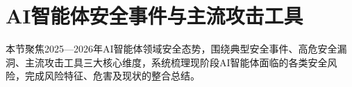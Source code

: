 


\section{AI智能体安全事件与主流攻击工具}
本节聚焦2025—2026年AI智能体领域安全态势，围绕典型安全事件、高危安全漏洞、主流攻击工具三大核心维度，系统梳理现阶段AI智能体面临的各类安全风险，完成风险特征、危害及现状的整合总结。


